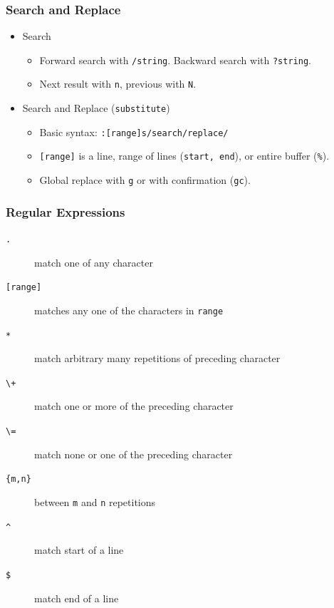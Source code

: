\documentclass{beamer}
\begin{document}
\begin{frame}
    \frametitle{Search and Replace}
    \begin{itemize}
        \item Search
        \begin{itemize}
            \item Forward search with \texttt{/string}. Backward search with \texttt{?string}.
            \item Next result with \texttt{n}, previous with \texttt{N}.
        \end{itemize}
        \item Search and Replace (\texttt{substitute})
        \begin{itemize}
            \item Basic syntax: \texttt{:[range]s/search/replace/}
            \item \texttt{[range]} is a line, range of lines (\texttt{start, end}), or entire buffer (\texttt{\%}).
            \item Global replace with \texttt{g} or with confirmation (\texttt{gc}).
        \end{itemize}
    \end{itemize}
\end{frame}
\begin{frame}
    \frametitle{Regular Expressions}
    \begin{description}
        \item [\texttt{.}] match one of any character
        \item [\texttt{[range]}] matches any one of the characters in \texttt{range}
        \item [\texttt{*}] match arbitrary many repetitions of preceding character
        \item [\texttt{\textbackslash+}] match one or more of the preceding character
        \item [\texttt{\textbackslash=}] match none or one of the preceding character
        \item [\texttt{\{m,n\}}] between \texttt{m} and \texttt{n} repetitions
        \item [\texttt{\textasciicircum}] match start of a line
        \item [\texttt{\$}] match end of a line
    \end{description}
\end{frame}
\end{document}
